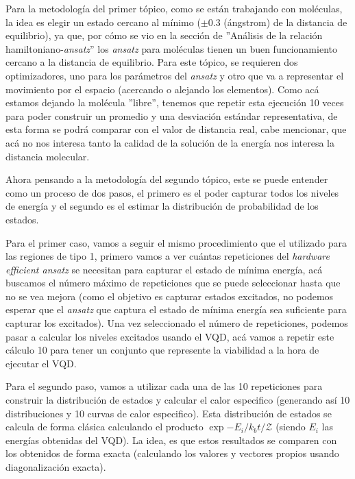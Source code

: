 Para la metodología del primer tópico, como se están trabajando con moléculas, la idea es elegir un estado cercano al mínimo ($\pm 0.3$ (ángstrom) de la distancia de equilibrio), ya que, por cómo se vio en la sección de ''Análisis de la relación hamiltoniano-\textit{ansatz}'' los \textit{ansatz} para moléculas tienen un buen funcionamiento cercano a la distancia de equilibrio. Para este tópico, se requieren dos optimizadores, uno para los parámetros del \textit{ansatz} y otro que va a representar el movimiento por el espacio (acercando o alejando los elementos). Como acá estamos dejando la molécula ''libre'', tenemos que repetir esta ejecución 10 veces para poder construir un promedio y una desviación estándar representativa, de esta forma se podrá comparar con el valor de distancia real, cabe mencionar, que acá no nos interesa tanto la calidad de la solución de la energía nos interesa la distancia molecular.

Ahora pensando a la metodología del segundo tópico, este se puede entender como un proceso de dos pasos, el primero es el poder capturar todos los niveles de energía y el segundo es el estimar la distribución de probabilidad de los estados. 

Para el primer caso, vamos a seguir el mismo procedimiento que el utilizado para las regiones de tipo 1, primero vamos a ver cuántas repeticiones del \textit{hardware efficient ansatz} se necesitan para capturar el estado de mínima energía, acá buscamos el número máximo de repeticiones que se puede seleccionar hasta que no se vea mejora (como el objetivo es capturar estados excitados, no podemos esperar que el \textit{ansatz} que captura el estado de mínima energía sea suficiente para capturar los excitados). Una vez seleccionado el número de repeticiones, podemos pasar a calcular los niveles excitados usando el VQD, acá vamos a repetir este cálculo 10 para tener un conjunto que represente la viabilidad a la hora de ejecutar el VQD. 

Para el segundo paso, vamos a utilizar cada una de las 10 repeticiones para construir la distribución de estados y calcular el calor especifico (generando así 10 distribuciones y 10 curvas de calor especifico). Esta distribución de estados se calcula de forma clásica calculando el producto $\exp{-E_i/k_b t}/\mathcal{Z}$ (siendo $E_i$ las energías obtenidas del VQD). La idea, es que estos resultados se comparen con los obtenidos de forma exacta (calculando los valores y vectores propios usando diagonalización exacta).


